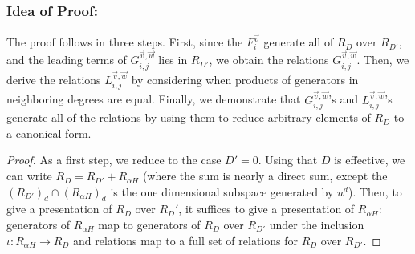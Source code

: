 \documentclass{amsart}
\theoremstyle{plain}
\theoremstyle{definition}
\theoremstyle{remark}
\numberwithin{equation}{subsection}
\newcommand\sssec{\subsubsection}
\newcommand\bp{{\mathbb P}}
\begin{document}
\sssec*{Idea of Proof:}
The proof follows in three steps. 
First, since the
$F_{i}^{\vec{v}}$ generate
all of $R_D$ over $R_{D'}$, and the leading terms of
$G_{i,j}^{\vec v, \vec w}$ lies in $R_{D'}$, we obtain the
relations $G_{i, j}^{\vec{v}, \vec{w}}$. 
Then, we derive the relations
$L_{i, j}^{\vec{v}, \vec{w}}$ by considering when products of
generators in neighboring degrees are equal. Finally, we demonstrate
that $G_{i, j}^{\vec{v}, \vec{w}}$'s and $L_{i, j}^{\vec{v}, \vec{w}}$'s
generate all of the relations by using them to reduce arbitrary
elements of
$R_D$ to a canonical form.

\begin{proof}
As a first step, we reduce to the case $D' = 0$.
Using that $D$ is effective, we can write
$R_D = R_{D'} + R_{\alpha H}$ (where the sum is nearly a direct sum, except 
the $(R_{D'})_d \cap (R_{\alpha H})_d$ is the one dimensional subspace generated by $u^d$).
Then, to give a presentation of $R_D$ over $R_D'$,
it suffices to give a presentation of $R_{\alpha H}$:
generators of $R_{\alpha H}$ map to generators of $R_D$ over $R_{D'}$ under the inclusion $\iota: R_{\alpha H} \rightarrow R_D$
and relations map to a full set of relations for $R_D$ over $R_{D'}$.


\end{proof}
\end{document}
